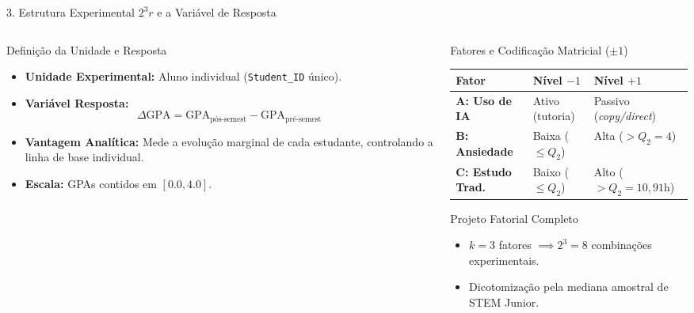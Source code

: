 \documentclass[aspectratio=169, 10pt]{beamer}
\begin{document}
\begin{frame}{3. Estrutura Experimental $2^3 r$ e a Variável de Resposta}
    \begin{columns}[T]
        \begin{column}{0.4\textwidth}
            \begin{block}{Definição da Unidade e Resposta}
                \begin{itemize}\setlength{\itemsep}{6pt}
                    \item \textbf{Unidade Experimental:} Aluno individual (\texttt{Student\_ID} único).
                    \item \textbf{Variável Resposta:}
                    $$\Delta \text{GPA} = \text{GPA}_{\text{pós-semest}} - \text{GPA}_{\text{pré-semest}}$$
                    \item \textbf{Vantagem Analítica:} Mede a evolução marginal de cada estudante, controlando a linha de base individual.
                    \item \textbf{Escala:} GPAs contidos em $[0.0, 4.0]$.
                \end{itemize}
            \end{block}
        \end{column}

        \begin{column}{0.55\textwidth}
            \begin{block}{Fatores e Codificação Matricial ($\pm 1$)}
                \centering \small  
                \begin{tabular}{lll}
                    \toprule
                    \textbf{Fator} & \textbf{Nível $-1$} & \textbf{Nível $+1$} \\
                    \midrule
                    \textbf{A: Uso de IA} & Ativo (tutoria) & Passivo (\textit{copy/direct}) \\
                    \textbf{B: Ansiedade} & Baixa ($\le Q_2$) & Alta ($> Q_2=4$) \\
                    \textbf{C: Estudo Trad.} & Baixo ($\le Q_2$) & Alto ($> Q_2=10,91\text{h}$) \\
                    \bottomrule
                \end{tabular}
            \end{block}

            \begin{exampleblock}{Projeto Fatorial Completo}
                \begin{itemize}
                    \item $k = 3$ fatores $\implies 2^3 = 8$ combinações experimentais.
                    \item Dicotomização pela mediana amostral de STEM Junior.
                \end{itemize}
            \end{exampleblock}
        \end{column}
    \end{columns}
\end{frame}
\end{document}
